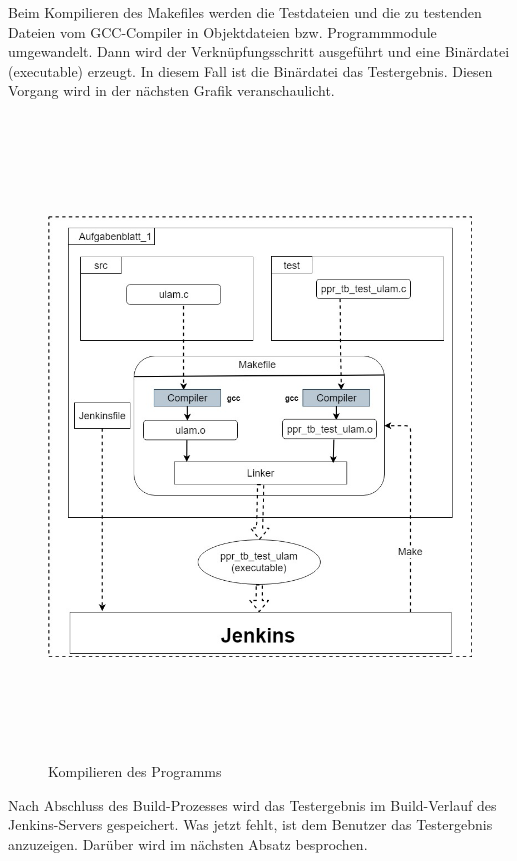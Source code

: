\documentclass[a4paper,12pt,oneside]{book}
\begin{document}
Beim Kompilieren des Makefiles werden die Testdateien und die zu testenden Dateien vom GCC-Compiler in Objektdateien bzw. Programmmodule umgewandelt. Dann wird der Verknüpfungsschritt ausgeführt und eine Binärdatei (executable) erzeugt. In diesem Fall ist die Binärdatei das Testergebnis. Diesen Vorgang wird in der nächsten Grafik veranschaulicht.
\newpage
\begin{figure}[h!]
	\begin{center}
		\includegraphics[width=15cm, height=17cm]{Makefile.jpg}
		\caption{Kompilieren des Programms} 
		\label{Kompilieren des Programms} 
	\end{center}
\end{figure}

Nach Abschluss des Build-Prozesses wird das Testergebnis im Build-Verlauf des Jenkins-Servers gespeichert. Was jetzt fehlt, ist dem Benutzer das Testergebnis anzuzeigen. Darüber wird im nächsten Absatz besprochen.
\newpage
\end{document}
